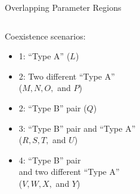 \begin{frame}{Overlapping Parameter Regions}
	\vspace{-1em}
	\begin{columns}
		\begin{column}{.5 \textwidth}
			Coexistence scenarios:
			\begin{itemize}
				\item 1: ``Type A'' ($L$)
				\item 2: Two different ``Type A'' \\ ($M, N, O,$ and $P$)
				\item 2: ``Type B'' pair ($Q$)
				\item 3: ``Type B'' pair and ``Type A'' \\ ($R, S, T,$ and $U$)
				\item 4: ``Type B'' pair \\ and two different ``Type A'' \\ ($V, W, X,$ and $Y$)
			\end{itemize}


\end{column}
\end{columns}
\end{frame}
